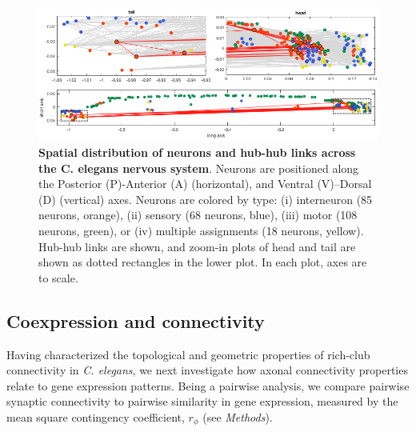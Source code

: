 \documentclass[10pt,letterpaper]{article}
\begin{document}
\begin{figure}[h]
\centering
    \includegraphics[width=1\textwidth]{SpatialPlot.png}
\caption{
\textbf{Spatial distribution of neurons and hub-hub links across the C. elegans nervous system}.
Neurons are positioned along the Posterior (P)-Anterior (A) (horizontal), and Ventral (V)--Dorsal (D) (vertical) axes.
Neurons are colored by type:
(i) interneuron (85 neurons, orange),
(ii) sensory (68 neurons, blue),
(iii) motor (108 neurons, green), or
(iv) multiple assignments (18 neurons, yellow).
Hub-hub links are shown, and zoom-in plots of head and tail are shown as dotted rectangles in the lower plot.
In each plot, axes are to scale.
\label{fig:neuronsSpace}
}
\end{figure}

\subsection*{Coexpression and connectivity}

Having characterized the topological and geometric properties of rich-club connectivity in \emph{C. elegans}, we next investigate how axonal connectivity properties relate to gene expression patterns.
Being a pairwise analysis, we compare pairwise synaptic connectivity to pairwise similarity in gene expression, measured by the mean square contingency coefficient, $r_\phi$ (see \emph{Methods}).
\end{document}
